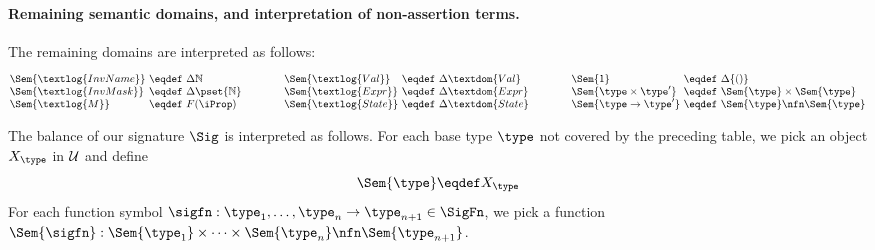 \paragraph{Remaining semantic domains, and interpretation of non-assertion terms.}

The remaining domains are interpreted as follows:
\[
\begin{array}[t]{@{}l@{\ }c@{\ }l@{}}
\Sem{\textlog{InvName}} &\eqdef& \Delta \mathbb{N}  \\
\Sem{\textlog{InvMask}} &\eqdef& \Delta \pset{\mathbb{N}} \\
\Sem{\textlog{M}} &\eqdef& F(\iProp)
\end{array}
\qquad\qquad
\begin{array}[t]{@{}l@{\ }c@{\ }l@{}}
\Sem{\textlog{Val}} &\eqdef& \Delta \textdom{Val} \\
\Sem{\textlog{Expr}} &\eqdef& \Delta \textdom{Expr} \\
\Sem{\textlog{State}} &\eqdef& \Delta \textdom{State} \\
\end{array}
\qquad\qquad
\begin{array}[t]{@{}l@{\ }c@{\ }l@{}}
\Sem{1} &\eqdef& \Delta \{ () \} \\
\Sem{\type \times \type'} &\eqdef& \Sem{\type} \times \Sem{\type} \\
\Sem{\type \to \type'} &\eqdef& \Sem{\type} \nfn \Sem{\type} \\
\end{array}
\]

The balance of our signature $\Sig$ is interpreted as follows.
For each base type $\type$ not covered by the preceding table, we pick an object $X_\type$ in $\cal U$ and define
\[
\Sem{\type} \eqdef X_\type
\]
For each function symbol $\sigfn : \type_1, \dots, \type_n \to \type_{n+1} \in \SigFn$, we pick a function $\Sem{\sigfn} : \Sem{\type_1} \times \dots \times \Sem{\type_n} \nfn \Sem{\type_{n+1}}$.

